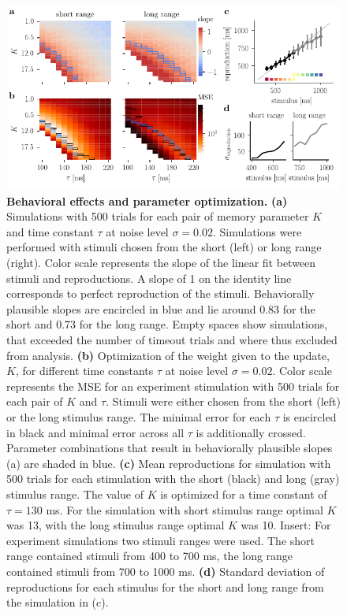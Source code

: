 \documentclass[10pt]{article}
\begin{document}
\begin{figure}[ht]
	\centering
	\includegraphics{figures/interIparams.pdf}
	\caption{\textbf{Behavioral effects and parameter optimization.} 
	\textbf{(a)} Simulations with 500 trials for each pair of memory parameter $K$ and time constant $\tau$ at noise level $\sigma = 0.02$. Simulations were performed with stimuli chosen from the short (left) or long range (right). Color scale represents the slope of the linear fit between stimuli and reproductions. A slope of 1 on the identity line corresponds to perfect reproduction of the stimuli. Behaviorally plausible slopes are encircled in blue and lie around 0.83 for the short and 0.73 for the long range. Empty spaces show simulations, that exceeded the number of timeout trials and where thus excluded from analysis.
	\textbf{(b)} Optimization of the weight given to the update, $K$, for different time constants $\tau$ at noise level $\sigma = 0.02$. Color scale represents the MSE for an experiment stimulation with 500 trials for each pair of $K$ and $\tau$. Stimuli were either chosen from the short (left) or the long stimulus range. The minimal error for each $\tau$ is encircled in black and minimal error across all $\tau$ is additionally crossed. Parameter combinations that result in behaviorally plausible slopes (a) are shaded in blue.
	\textbf{(c)} Mean reproductions for simulation with 500 trials for each stimulation with the short (black) and long (gray) stimulus range. The value of $K$ is optimized for a time constant of $\tau = 130$ ms. For the simulation with short stimulus range optimal $K$ was 13, with the long stimulus range optimal $K$ was 10. 
		Insert: For experiment simulations two stimuli ranges were used. The short range contained stimuli from 400 to 700 ms, the long range contained stimuli from 700 to 1000 ms.
	\textbf{(d)} Standard deviation of reproductions for each stimulus for the short and long range from the simulation in (c).
	}
\label{fig:parameter}
\end{figure}
\end{document}
